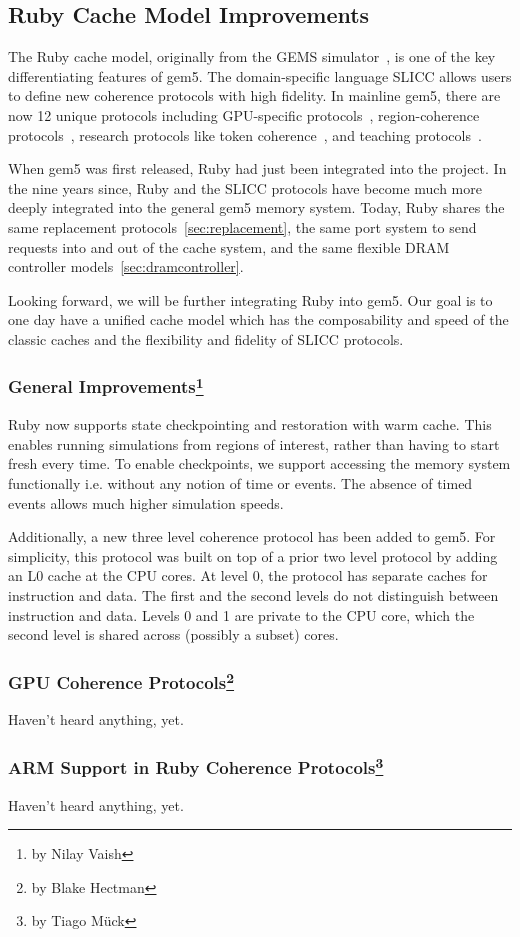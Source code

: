 \subsection[Ruby Cache Model Improvements]{Ruby Cache Model Improvements}
\label{sec:ruby}

The Ruby cache model, originally from the GEMS simulator~\cite{}, is one of the key differentiating features of gem5.
The domain-specific language SLICC allows users to define new coherence protocols with high fidelity.
In mainline gem5, there are now 12 unique protocols including GPU-specific protocols~\cite{viper}, region-coherence protocols~\cite{Power2012hsc}, research protocols like token coherence~\cite{token-coherence}, and teaching protocols~\cite{coherence-primer}.

When gem5 was first released, Ruby had just been integrated into the project.
In the nine years since, Ruby and the SLICC protocols have become much more deeply integrated into the general gem5 memory system.
Today, Ruby shares the same replacement protocols~\ref{sec:replacement}, the same port system to send requests into and out of the cache system, and the same flexible DRAM controller models~\ref{sec:dramcontroller}.

Looking forward, we will be further integrating Ruby into gem5.
Our goal is to one day have a unified cache model which has the composability and speed of the classic caches and the flexibility and fidelity of SLICC protocols.

\subsubsection[General Improvements]{General Improvements\footnote{by Nilay Vaish}}

Ruby now supports state checkpointing and restoration with warm cache.
This enables running simulations from regions of interest, rather than having to start fresh every time.
To enable checkpoints, we support accessing the memory system functionally i.e. without any notion of time or events.
The absence of timed events allows much higher simulation speeds.

Additionally, a new three level coherence protocol has been added to gem5.
For simplicity, this protocol was built on top of a prior two level protocol by adding an L0 cache at the CPU cores.
At level 0, the protocol has separate caches for instruction and data.
The first and the second levels do not distinguish between instruction and data.
Levels 0 and 1 are private to the CPU core, which the second level is shared across (possibly a subset) cores.

\subsubsection[GPU Coherence Protocols]{GPU Coherence Protocols\footnote{by Blake Hectman}}

Haven't heard anything, yet.

\subsubsection[ARM Support and Extensions]{ARM Support in Ruby Coherence Protocols\footnote{by Tiago M{\"u}ck}}

Haven't heard anything, yet.
